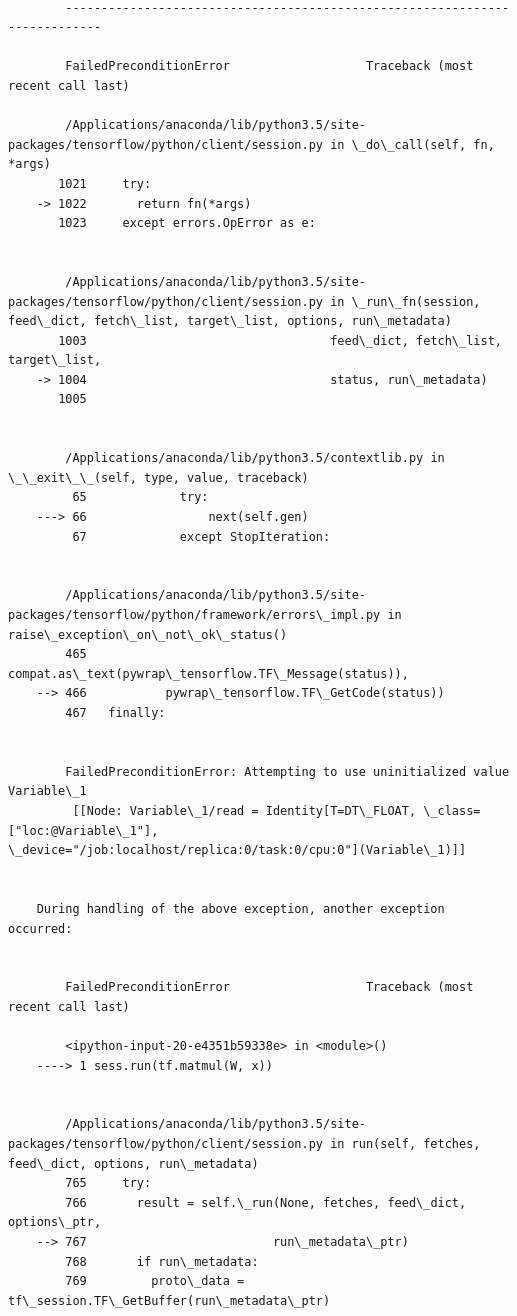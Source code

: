 \documentclass[11pt]{article}
\begin{document}
    \begin{Verbatim}[commandchars=\\\{\}]

        ---------------------------------------------------------------------------

        FailedPreconditionError                   Traceback (most recent call last)

        /Applications/anaconda/lib/python3.5/site-packages/tensorflow/python/client/session.py in \_do\_call(self, fn, *args)
       1021     try:
    -> 1022       return fn(*args)
       1023     except errors.OpError as e:


        /Applications/anaconda/lib/python3.5/site-packages/tensorflow/python/client/session.py in \_run\_fn(session, feed\_dict, fetch\_list, target\_list, options, run\_metadata)
       1003                                  feed\_dict, fetch\_list, target\_list,
    -> 1004                                  status, run\_metadata)
       1005 


        /Applications/anaconda/lib/python3.5/contextlib.py in \_\_exit\_\_(self, type, value, traceback)
         65             try:
    ---> 66                 next(self.gen)
         67             except StopIteration:


        /Applications/anaconda/lib/python3.5/site-packages/tensorflow/python/framework/errors\_impl.py in raise\_exception\_on\_not\_ok\_status()
        465           compat.as\_text(pywrap\_tensorflow.TF\_Message(status)),
    --> 466           pywrap\_tensorflow.TF\_GetCode(status))
        467   finally:


        FailedPreconditionError: Attempting to use uninitialized value Variable\_1
    	 [[Node: Variable\_1/read = Identity[T=DT\_FLOAT, \_class=["loc:@Variable\_1"], \_device="/job:localhost/replica:0/task:0/cpu:0"](Variable\_1)]]

        
    During handling of the above exception, another exception occurred:


        FailedPreconditionError                   Traceback (most recent call last)

        <ipython-input-20-e4351b59338e> in <module>()
    ----> 1 sess.run(tf.matmul(W, x))
    

        /Applications/anaconda/lib/python3.5/site-packages/tensorflow/python/client/session.py in run(self, fetches, feed\_dict, options, run\_metadata)
        765     try:
        766       result = self.\_run(None, fetches, feed\_dict, options\_ptr,
    --> 767                          run\_metadata\_ptr)
        768       if run\_metadata:
        769         proto\_data = tf\_session.TF\_GetBuffer(run\_metadata\_ptr)



\end{Verbatim}
\end{document}
